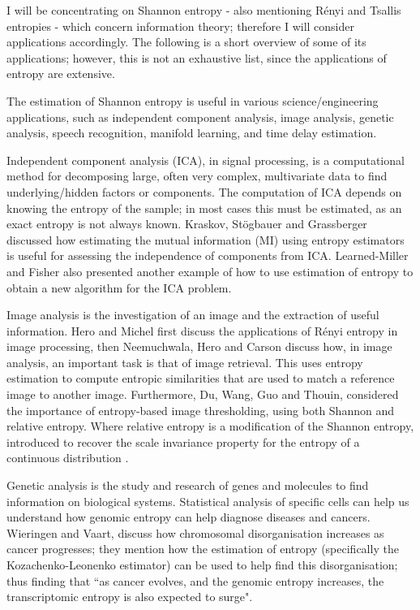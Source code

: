 \documentclass[12pt]{report}
\begin{document}
I will be concentrating on Shannon entropy - also mentioning R\'enyi and Tsallis entropies - which concern information theory; therefore I will consider applications accordingly. The following is a short overview of some of its applications; however, this is not an exhaustive list, since the applications of entropy are extensive.

The estimation of Shannon entropy is useful in various science/engineering applications, such as independent component analysis, image analysis, genetic analysis, speech recognition, manifold learning, and time delay estimation.

Independent component analysis (ICA), in signal processing, is a computational method for decomposing large, often very complex, multivariate data to find underlying/hidden factors or components. The computation of ICA depends on knowing the entropy of the sample; in most cases this must be estimated, as an exact entropy is not always known. Kraskov, St\"{o}gbauer and Grassberger \cite{ICA1} discussed how estimating the mutual information (MI) using entropy estimators is useful for assessing the independence of components from ICA. Learned-Miller and Fisher \cite{ICA2} also presented another example of how to use estimation of entropy to obtain a new algorithm for the ICA problem. 

Image analysis is the investigation of an image and the extraction of useful information. Hero and Michel \cite{IM2} first discuss the applications of R\'enyi entropy in image processing, then Neemuchwala, Hero and Carson \cite{IM1} discuss how, in image analysis, an important task is that of image retrieval. This uses entropy estimation to compute entropic similarities that are used to match a reference image to another image.  Furthermore, Du, Wang, Guo and Thouin, \cite{IM3} considered the importance of entropy-based image thresholding, using both Shannon and relative entropy. Where relative entropy is a modification of the Shannon entropy, introduced to recover the scale invariance property for the entropy of a continuous distribution \cite{book1}.

Genetic analysis is the study and research of genes and molecules to find information on biological systems. Statistical analysis of specific cells can help us understand how genomic entropy can help diagnose diseases and cancers. Wieringen and Vaart, \cite{gen1} discuss how chromosomal disorganisation increases as cancer progresses; they mention how the estimation of entropy (specifically the Kozachenko-Leonenko estimator) can be used to help find this disorganisation; thus finding that ``as cancer evolves, and the genomic entropy increases, the transcriptomic entropy is also expected to surge". 
\end{document}
